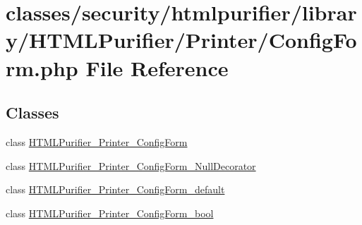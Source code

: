 \hypertarget{ConfigForm_8php}{\section{classes/security/htmlpurifier/library/\+H\+T\+M\+L\+Purifier/\+Printer/\+Config\+Form.php File Reference}
\label{ConfigForm_8php}
}
\subsection*{Classes}
\begin{DoxyCompactItemize}
\item 
class \hyperlink{classHTMLPurifier__Printer__ConfigForm}{H\+T\+M\+L\+Purifier\+\_\+\+Printer\+\_\+\+Config\+Form}
\item 
class \hyperlink{classHTMLPurifier__Printer__ConfigForm__NullDecorator}{H\+T\+M\+L\+Purifier\+\_\+\+Printer\+\_\+\+Config\+Form\+\_\+\+Null\+Decorator}
\item 
class \hyperlink{classHTMLPurifier__Printer__ConfigForm__default}{H\+T\+M\+L\+Purifier\+\_\+\+Printer\+\_\+\+Config\+Form\+\_\+default}
\item 
class \hyperlink{classHTMLPurifier__Printer__ConfigForm__bool}{H\+T\+M\+L\+Purifier\+\_\+\+Printer\+\_\+\+Config\+Form\+\_\+bool}
\end{DoxyCompactItemize}
